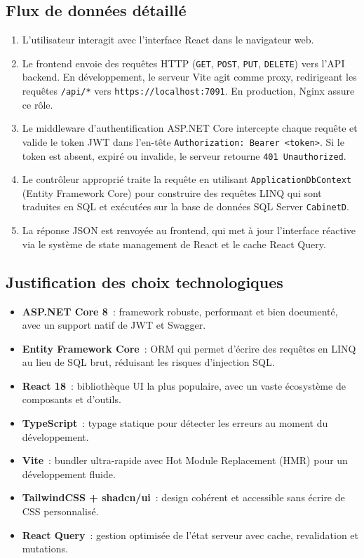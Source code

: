 \subsection{Flux de données détaillé}

\begin{enumerate}
    \item L'utilisateur interagit avec l'interface React dans le navigateur web.
    \item Le frontend envoie des requêtes HTTP (\texttt{GET}, \texttt{POST}, \texttt{PUT}, \texttt{DELETE}) vers l'API backend. En développement, le serveur Vite agit comme proxy, redirigeant les requêtes \texttt{/api/*} vers \texttt{https://localhost:7091}. En production, Nginx assure ce rôle.
    \item Le middleware d'authentification ASP.NET Core intercepte chaque requête et valide le token JWT dans l'en-tête \texttt{Authorization: Bearer <token>}. Si le token est absent, expiré ou invalide, le serveur retourne \texttt{401 Unauthorized}.
    \item Le contrôleur approprié traite la requête en utilisant \texttt{ApplicationDbContext} (Entity Framework Core) pour construire des requêtes LINQ qui sont traduites en SQL et exécutées sur la base de données SQL Server \texttt{CabinetD}.
    \item La réponse JSON est renvoyée au frontend, qui met à jour l'interface réactive via le système de state management de React et le cache React Query.
\end{enumerate}

\subsection{Justification des choix technologiques}

\begin{itemize}
    \item \textbf{ASP.NET Core 8}~: framework robuste, performant et bien documenté, avec un support natif de JWT et Swagger.
    \item \textbf{Entity Framework Core}~: ORM qui permet d'écrire des requêtes en LINQ au lieu de SQL brut, réduisant les risques d'injection SQL.
    \item \textbf{React 18}~: bibliothèque UI la plus populaire, avec un vaste écosystème de composants et d'outils.
    \item \textbf{TypeScript}~: typage statique pour détecter les erreurs au moment du développement.
    \item \textbf{Vite}~: bundler ultra-rapide avec Hot Module Replacement (HMR) pour un développement fluide.
    \item \textbf{TailwindCSS + shadcn/ui}~: design cohérent et accessible sans écrire de CSS personnalisé.
    \item \textbf{React Query}~: gestion optimisée de l'état serveur avec cache, revalidation et mutations.
\end{itemize}

